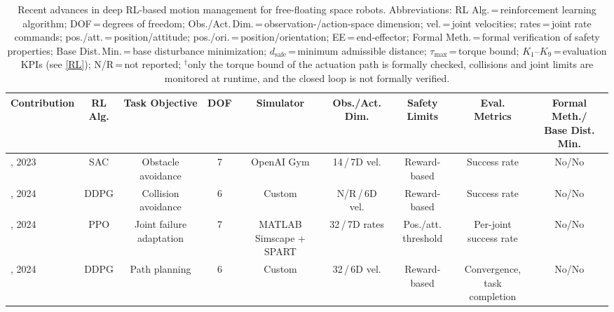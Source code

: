 \documentclass{ieeeaccess}
\begin{document}
\begin{table}[!t]
	\centering
	\caption{Recent advances in deep RL-based motion management for free-floating space robots.
  Abbreviations: RL Alg.\,=\,reinforcement learning algorithm; DOF\,=\,degrees of freedom;
  Obs./Act.\,Dim.\,=\,observation-/action-space dimension; vel.\,=\,joint velocities; rates\,=\,joint
  rate commands; pos./att.\,=\,position/attitude; pos./ori.\,=\,position/orientation;
  EE\,=\,end-effector; Formal Meth.\,=\,formal verification of safety properties; Base Dist.\,Min.\,=\,base
  disturbance minimization; $d_{\mathrm{safe}}$\,=\,minimum admissible distance; $\tau_{\max}$\,=\,torque
  bound; $K_1$--$K_9$\,=\,evaluation KPIs (see \cref{RL}); N/R\,=\,not reported; $^{\dagger}$only the
  torque bound of the actuation path is formally checked, collisions and joint limits are monitored at
  runtime, and the closed loop is not formally verified.}
	\label{tab:sample}
	\scriptsize
	\renewcommand{\arraystretch}{1.25}
	\begin{tabular}{lcccccccc}
		\toprule
		\textbf{Contribution} & \makecell{\textbf{RL}\\\textbf{Alg.}} & \textbf{Task Objective} &
		  \textbf{DOF} & \textbf{Simulator} & \makecell{\textbf{Obs./Act.}\\\textbf{Dim.}} &
		  \makecell{\textbf{Safety}\\\textbf{Limits}} & \makecell{\textbf{Eval.}\\\textbf{Metrics}} &
		  \makecell{\textbf{Formal Meth./}\\\textbf{Base Dist. Min.}} \\
		\midrule
		\cite{huang2023obstacle}, 2023 & SAC & Obstacle avoidance & 7 & OpenAI Gym & 14\,/\,7D vel. &
		  Reward-based & Success rate & No/No \\
		\cite{al2024reinforcement}, 2024 & DDPG & Collision avoidance & 6 & Custom & N/R\,/\,6D vel. &
		  Reward-based & Success rate & No/No \\
		\cite{d2024failure}, 2024 & PPO & \makecell{Joint failure\\adaptation} & 7 &
		  \makecell{MATLAB\\Simscape + SPART} & 32\,/\,7D rates & \makecell{Pos./att.\\threshold} &
		  \makecell{Per-joint\\success rate} & No/No \\
		\cite{al2024path}, 2024 & DDPG & Path planning & 6 & Custom & 32\,/\,6D vel. & Reward-based &
		  \makecell{Convergence,\\task completion} & No/No \\

\end{tabular}
\end{table}
\end{document}
